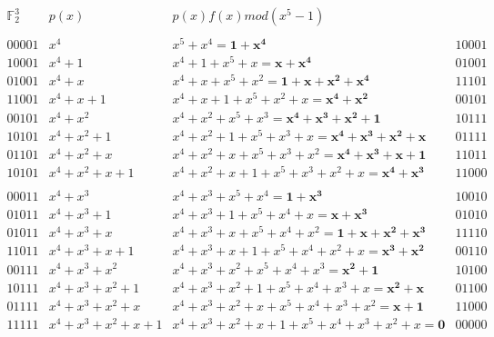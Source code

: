 \begin{frame}  \tiny
\[
    \begin{array}{cccl}
					 \mathbb{F}_2^3 & p(x) &  p(x)f(x) mod (x^5-1)  \\ 
					        &     &  &\\ 
00001	 & x^4 & x^5+x^4 =\mathbf{1+x^4}																		  &10001\\
10001 & x^4+1 & x^4+1+x^5+x =\mathbf{x+x^4}															  &01001\\
01001 & x^4+x & x^4+x+x^5+x^2=\mathbf{1+x+x^2+x^4}											  &11101\\
11001 & x^4+x+1 & x^4+x+1+x^5+x^2+x =\mathbf {x^4+x^2} 									  &00101 \\
00101 & x^4+x^2 & x^4+x^2+x^5+x^3 = \mathbf {x^4+x^3+x^2+1} 							  &10111\\
10101 & x^4+x^2+1 & x^4+x^2+1+x^5+x^3+x =\mathbf {x^4+x^3+x^2+x} 				  &01111\\
01101 & x^4+x^2+x & x^4+x^2+x+x^5+x^3+x^2=\mathbf {x^4+x^3+x+1} 				  &11011 \\
10101 & x^4+x^2+x+1 & x^4+x^2+x+1+x^5+x^3+x^2+x =\mathbf {x^4+x^3}			  &11000 \\
& & &\\
00011 & x^4+x^3 & x^4+x^3+x^5+x^4 =\mathbf{1+x^3}												   &10010\\
01011 & x^4+x^3+1 & x^4+x^3+1+x^5+x^4+x =\mathbf{x+x^3}									   &01010\\
01011 & x^4+x^3+x & x^4+x^3+x+x^5+x^4+x^2=\mathbf{1+x+x^2+x^3}					   &11110\\
11011 & x^4+x^3+x+1 & x^4+x^3+x+1+x^5+x^4+x^2+x =\mathbf {x^3+x^2} 			   &00110\\
00111 & x^4+x^3+x^2 & x^4+x^3+x^2+x^5+x^4+x^3 = \mathbf {x^2+1} 					   &10100\\
10111 & x^4+x^3+x^2+1 & x^4+x^3+x^2+1+x^5+x^4+x^3+x =\mathbf {x^2+x} 		   &01100\\
01111 & x^4+x^3+x^2+x & x^4+x^3+x^2+x+x^5+x^4+x^3+x^2=\mathbf {x+1} 		   &11000\\
11111 & x^4+x^3+x^2+x+1 & x^4+x^3+x^2+x+1+x^5+x^4+x^3+x^2+x =\mathbf {0} &00000\\
& & &\\


	\end{array}	    		
\]
\end{frame}

